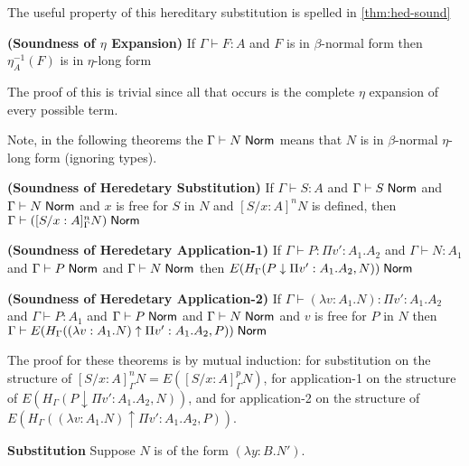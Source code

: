 The useful property of this hereditary substitution is spelled in \ref{thm:hed-sound}

\begin{theorem}
\textbf{(Soundness of $\eta$ Expansion)}
If  $\Gamma \vdash F : A$ 
and $F$ is in $\beta$-normal form then
$\eta^{-1}_{A}(F)$ is in $\eta$-long form
\label{thm:hed-long}
\end{theorem}

The proof of this is trivial since all that occurs is the complete $\eta$ expansion 
of every possible term. 

Note, in the following theorems the $\Gamma \vdash N \; \mathsf{Norm}$ means that $N $ is in $\beta$-normal 
$\eta$-long form (ignoring types).

\begin{theorem}
\textbf{(Soundness of Heredetary Substitution)}
If  $\Gamma \vdash S : A$ 
and $\Gamma \vdash S \; \mathsf{Norm}$ 
and $\Gamma \vdash N \; \mathsf{Norm}$ 
and $x$ is free for $S$ in $N$
and $[S / x : A]^n N$ is defined, 
then $\Gamma \vdash ([S / x : A]_\Gamma^n N) \; \mathsf{Norm}$ 
\label{thm:hed-sound}
\end{theorem}
\begin{theorem}
\textbf{(Soundness of Heredetary Application-1)}
If  $\Gamma \vdash P : \Pi v' : A_1 . A_2$ 
and $\Gamma \vdash N : A_1$ 
and $\Gamma \vdash P \; \mathsf{Norm}$ 
and $\Gamma \vdash N \; \mathsf{Norm}$ 
then $E(H_\Gamma(P \downarrow \Pi v' : A_1 . A_2 , N)) \; \mathsf{Norm}$ 
\label{thm:hed-app1}
\end{theorem}
\begin{theorem}
\textbf{(Soundness of Heredetary Application-2)}
If  $\Gamma \vdash (\lambda v : A_1 . N) : \Pi v' : A_1 . A_2$ 
and $\Gamma \vdash P : A_1$ 
and $\Gamma \vdash P \; \mathsf{Norm}$ 
and $\Gamma \vdash N \; \mathsf{Norm}$ 
and $v$ is free for $P$ in $N$
then $\Gamma \vdash E(H_\Gamma((\lambda v : A_1 . N) \uparrow \Pi v' : A_1 . A_2 , P)) \; \mathsf{Norm}$ 
\label{thm:hed-app2}
\end{theorem}

The proof for these theorems is by mutual induction:  
for substitution on the structure of $[S/x : A]_\Gamma^n N = E([S/x : A]_\Gamma^p N)$, 
for application-1 on the structure of $E(H_\Gamma(P \downarrow \Pi v' : A_1 . A_2 , N))$,
and for application-2 on the structure of $E(H_\Gamma((\lambda v : A_1 . N) \uparrow \Pi v' : A_1 . A_2 , P))$.

\setcounter{tcases}{0}
\begin{tcases}
\textbf{Substitution} Suppose $N$ is of the form $(\lambda y : B . N')$.
\end{tcases}

